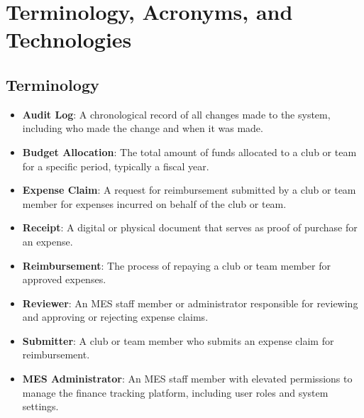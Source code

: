\documentclass[12pt]{article}
\begin{document}
\section{Terminology, Acronyms, and Technologies}

  \subsection{Terminology}
    \begin{itemize}
      \item \textbf{Audit Log}: A chronological record of all changes made to the system, including who made the change and when it was made.
      \item \textbf{Budget Allocation}: The total amount of funds allocated to a club or team for a specific period, typically a fiscal year.
      \item \textbf{Expense Claim}: A request for reimbursement submitted by a club or team member for expenses incurred on behalf of the club or team.
      \item \textbf{Receipt}: A digital or physical document that serves as proof of purchase for an expense.
      \item \textbf{Reimbursement}: The process of repaying a club or team member for approved expenses.
      \item \textbf{Reviewer}: An MES staff member or administrator responsible for reviewing and approving or rejecting expense claims.
      \item \textbf{Submitter}: A club or team member who submits an expense claim for reimbursement.
      \item \textbf{MES Administrator}: An MES staff member with elevated permissions to manage the finance tracking platform, including user roles and system settings.
    \end{itemize}
\end{document}
